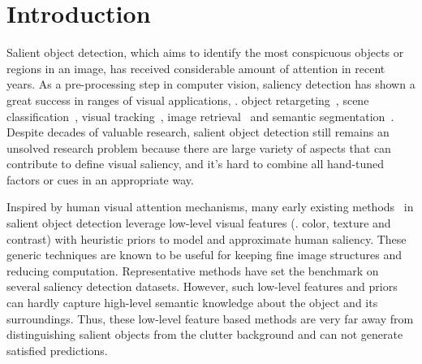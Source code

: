 \documentclass[10pt,twocolumn,letterpaper]{article}
\begin{document}
\section{Introduction}
Salient object detection, which aims to identify the most conspicuous objects or regions in an image, has received considerable amount of attention in recent years.
As a pre-processing step in computer vision, saliency detection has shown a great success in ranges of visual applications, \eg. object retargeting~\cite{ding2011importance,sun2011scale,Vinyals2014Show}, scene classification~\cite{siagian2007rapid,ren2014region}, visual tracking~\cite{borji2012adaptive,mahadevan2013biologically}, image retrieval~\cite{he2012mobile,gao20123} and semantic segmentation~\cite{donoser2009saliency}.
%
Despite decades of valuable research, salient object detection still remains an unsolved research problem because there are large variety of aspects that can contribute to define visual saliency, and it's hard to combine all hand-tuned factors or cues in an appropriate way.
%

Inspired by human visual attention mechanisms, many early existing methods~\cite{itti98,harel07,Federico12,jiang2013salient,yan2013hierarchical,yang2013saliency} in salient object detection leverage low-level visual features (\eg. color, texture and contrast) with heuristic priors to model and approximate human saliency.
%
These generic techniques are known to be useful for keeping fine image structures and reducing computation.
%
Representative methods have set the benchmark on several saliency detection datasets.
However, such low-level features and priors can hardly capture high-level semantic knowledge about the object and its surroundings.
%
Thus, these low-level feature based methods are very far away from distinguishing salient objects from the clutter background and can not generate satisfied predictions. %
\end{document}
